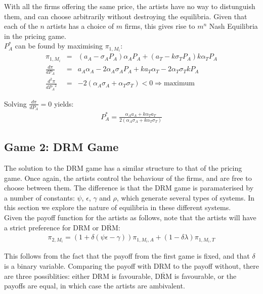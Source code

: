 \documentclass[a4paper,12pt]{article}
\numberwithin{equation}{section}
\newcommand{\drm}{\text{DRM}}
\newcommand{\nodrm}{\overline{\drm}}
\newcommand{\artistpayoff}[2]{\pi_{#1, M_{#2}}}
\newcommand{\artistalbum}[2]{\pi_{#1, M_{#2}, A}}
\newcommand{\artistticket}[2]{\pi_{#1, M_{#2}, T}}
\newcommand{\deriv}[2]{\frac{d #1}{d #2}}
\newcommand{\doublederiv}[2]{\frac{d^2 #1}{d {#2}^2}}
\begin{document}
With all the firms offering the same price, the artists have no way to distunguish them, and can choose arbitrarily without destroying the equilibria. Given that each of the $n$ artists has a choice of $m$ firms, this gives rise to $m^n$ Nash Equilibria in the pricing game.\\

$P_A^*$ can be found by maximising $\artistpayoff{1}{i}$:
\begin{eqnarray*}
\artistpayoff{1}{i} & = & (a_A - \sigma_A P_A)\alpha_A P_A + (a_T - k \sigma_T P_A) k \alpha_T P_A\\
\deriv{\pi}{P_A} & = & a_A \alpha_A - 2 \alpha_A \sigma_A P_A + k a_T \alpha_T - 2 \alpha_T \sigma_T k P_A\\
\doublederiv{\pi}{P_A} & = & -2(\alpha_A \sigma_A + \alpha_T \sigma_T) < 0 \Rightarrow \text{maximum}
\end{eqnarray*}

Solving $\deriv{\pi}{P_A} = 0$ yields:
\begin{eqnarray}
P_A^* = \frac{\alpha_A a_A + k \alpha_T a_T}{2(\alpha_A \sigma_A + k \alpha_T \sigma_T)}
\end{eqnarray}

\subsection{Game 2: DRM Game}

The solution to the DRM game has a similar structure to that of the pricing game. Once again, the artists control the behaviour of the firms, and are free to choose between them. The difference is that the DRM game is paramaterised by a number of constants: $\psi$, $\epsilon$, $\gamma$ and $\rho$, which generate several types of systems. In this section we explore the nature of equilibria in these different systems.\\

Given the payoff function for the artists as follows, note that the artists will have a strict preference for DRM or $\overline{\text{DRM}}$:
\begin{eqnarray*}
\artistpayoff{2}{i} = (1 + \delta (\psi \epsilon - \gamma)) \artistalbum{1}{i} + (1 - \delta \lambda) \artistticket{1}{i}
\end{eqnarray*}

This follows from the fact that the payoff from the first game is fixed, and that $\delta$ is a binary variable. Comparing the payoff with DRM to the payoff without, there are three possiblities: either DRM is favourable, $\nodrm$ is favourable, or the payoffs are equal, in which case the artists are ambivalent.\\
\end{document}
